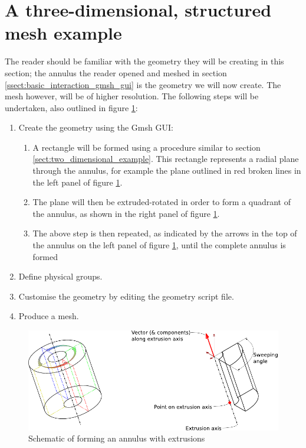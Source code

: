 \section{A three-dimensional, structured mesh example}
\label{sect:three_dimensional_example}
\par
The reader should be familiar with the geometry they will be creating in this section; the annulus
the reader opened and meshed in section \ref{ssect:basic_interaction_gmsh_gui} is the geometry
we will now create. The mesh however, will be of higher resolution. The following steps will be
undertaken, also outlined in figure \ref{fig:annulus_schematic}:
\begin{enumerate}
  \item Create the geometry using the Gmsh GUI:
  \begin{enumerate}
    \item A rectangle will be formed using a procedure similar to section
             \ref{sect:two_dimensional_example}. This rectangle represents a radial plane through the
             annulus, for example the plane outlined in red broken lines in the left panel of figure
             \ref{fig:annulus_schematic}.
    \item The plane will then be extruded-rotated in order to form a quadrant of the annulus, as
             shown in the right panel of figure \ref{fig:annulus_schematic}.
    \item The above step is then repeated, as indicated by the arrows in the top of the annulus on
             the left panel of figure \ref{fig:annulus_schematic}, until the complete annulus is formed
  \end{enumerate}
  \item Define physical groups.
  \item Customise the geometry by editing the geometry script file.
  \item Produce a mesh.
\end{enumerate}
\begin{figure}[htbp]
 \centering
  \includegraphics[width=1.0\textwidth]{../figures/annulus.pdf}
  \caption{Schematic of forming an annulus with extrusions}
  \label{fig:annulus_schematic}
\end{figure}

